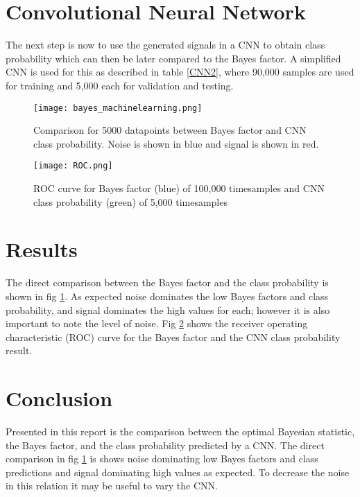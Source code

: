 \documentclass[12pt, letterpaper, twoside]{article}
\begin{document}
\section{Convolutional Neural Network}
The next step is now to use the generated signals in a CNN to obtain class probability which can then be later compared to the Bayes factor. A simplified CNN is used for this as described in table \ref{CNN2}, where 90,000 samples are used for training and 5,000 each for validation and testing.
\begin{figure}
\begin{center}
\texttt{[image: bayes\_machinelearning.png]}
\caption{Comparison for 5000 datapoints between Bayes factor and CNN class probability. Noise is shown in blue and signal is shown in red.}
\label{fig:comp}
\end{center}
\end{figure}
\begin{figure}[h]
\begin{center}
\texttt{[image: ROC.png]}
\caption{ROC curve for Bayes factor (blue) of 100,000 timesamples and CNN class probability (green) of 5,000 timesamples}
\label{fig:roc}
\end{center}
\end{figure}
\section{Results}
The direct comparison between the Bayes factor and the class probability is shown in fig \ref{fig:comp}. As expected noise dominates the low Bayes factors and class probability, and signal dominates the high values for each; however it is also important to note the level of noise. Fig \ref{fig:roc} shows the receiver operating characteristic (ROC) curve for the Bayes factor and the CNN class probability result.

\section{Conclusion}
Presented in this report is the comparison between the optimal Bayesian statistic, the Bayes factor, and the class probability predicted by a CNN. The direct comparison in fig \ref{fig:comp} is shows noise dominating low Bayes factors and class predictions and signal dominating high values as expected. To decrease the noise in this relation it may be useful to vary the CNN. 
\end{document}
